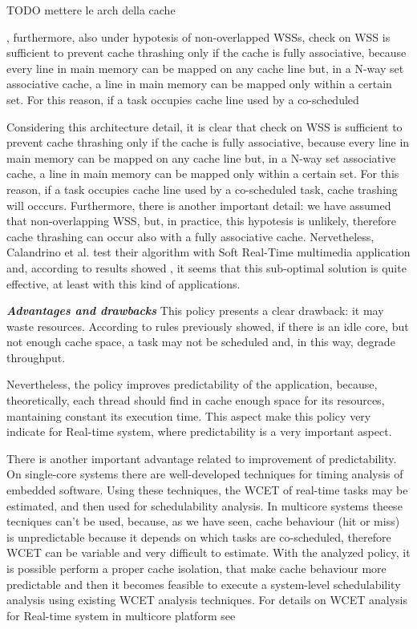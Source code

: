 \begin{description}
TODO mettere le arch della cache

, furthermore, also under hypotesis of non-overlapped WSSs, check on WSS is sufficient
to prevent cache thrashing only if the cache is fully associative, because every line in main memory can be mapped on any cache line but, in a N-way 
set associative cache, a line in main memory can be mapped only within a certain set. For this reason, if a task occupies cache line used by a co-scheduled 


Considering this architecture detail, it is clear that check on WSS is sufficient to prevent cache thrashing only if the cache is fully associative, because every line in main memory can be mapped on any cache line but, in a N-way set associative cache, a line in main memory can be mapped only within a certain 
set. For this reason, if a task occupies cache line used by a co-scheduled task, cache trashing will occcurs. Furthermore, there is another important 
detail: we have assumed that non-overlapping WSS, but, in practice, this hypotesis is unlikely, therefore cache thrashing can occur also with a fully associative cache. Nervetheless, Calandrino et al. test their algorithm with Soft Real-Time multimedia application and, according to results showed 
\cite{calandro}, it seems that this sub-optimal solution is quite effective, at least with this kind of applications.

\textbf{\textit{Advantages and drawbacks}} This policy presents a clear drawback: it may waste resources. According to rules previously showed, if there 
is an idle core, but not enough cache space, a task may not be scheduled and, in this way, degrade throughput. 

Nevertheless, the policy improves predictability of the application, because, theoretically, each thread should find in cache enough space for its 
resources, mantaining constant its execution time. This aspect make this policy very indicate for Real-time system, where predictability is a very 
important aspect.

There is another important advantage related to improvement of predictability. On single-core systems there are well-developed techniques for timing 
analysis of embedded software. Using these techniques, the WCET of real-time tasks may be estimated, and then used for schedulability analysis. 
In multicore systems theese tecniques can't be used, because, as we have seen, cache behaviour (hit or miss) is unpredictable because it depends on which 
tasks are co-scheduled, therefore WCET can be variable and very difficult to estimate. With the analyzed policy, it is possible perform a proper cache 
isolation, that make cache behaviour more predictable and then it becomes feasible to execute a system-level schedulability analysis using existing WCET 
analysis techniques. For details on WCET analysis for Real-time system in multicore platform see \cite{guann}



\end{description}

